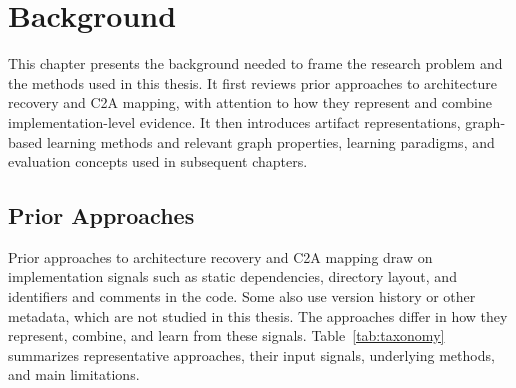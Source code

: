 \chapter{Background \label{ch:background}}
\chaptertoc

This chapter presents the background needed to frame the research problem and the methods used in this thesis. It first reviews prior approaches to architecture recovery and C2A mapping, with attention to how they represent and combine implementation-level evidence. It then introduces artifact representations, graph-based learning methods and relevant graph properties, learning paradigms, and evaluation concepts used in subsequent chapters.

\section{Prior Approaches \label{sec:bg_prior}}

Prior approaches to architecture recovery and C2A mapping draw on implementation signals such as static dependencies, directory layout, and identifiers and comments in the code. Some also use version history or other metadata, which are not studied in this thesis. The approaches differ in how they represent, combine, and learn from these signals. Table~\ref{tab:taxonomy} summarizes representative approaches, their input signals, underlying methods, and main limitations.

